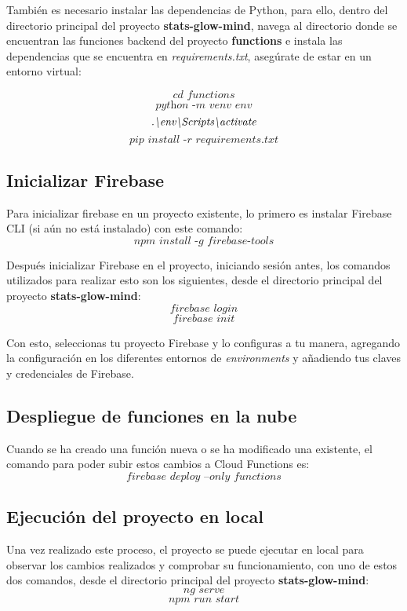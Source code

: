 También es necesario instalar las dependencias de Python, para ello, dentro del directorio principal del proyecto \textbf{stats-glow-mind}, navega al directorio donde se encuentran las funciones backend del proyecto \textbf{functions} e instala las dependencias que se encuentra en \textit{requirements.txt}, asegúrate de estar en un entorno virtual:

$$ \textit{cd functions} $$
$$ \textit{python -m venv env} $$
$$ \textit{.\text{\textbackslash}env\text{\textbackslash}Scripts\text{\textbackslash}activate} $$
$$ \textit{pip install -r requirements.txt} $$

\subsection{Inicializar Firebase}

Para inicializar firebase en un proyecto existente, lo primero es instalar Firebase CLI (si aún no está instalado) con este comando:
$$ \textit{npm install -g firebase-tools} $$

Después inicializar Firebase en el proyecto, iniciando sesión antes, los comandos utilizados para realizar esto son los siguientes, desde el directorio principal del proyecto \textbf{stats-glow-mind}:
$$ \textit{firebase login} $$
$$ \textit{firebase init} $$

Con esto, seleccionas tu proyecto Firebase y lo configuras a tu manera, agregando la configuración en los diferentes entornos de \textit{environments} y añadiendo tus claves y credenciales de Firebase.

\subsection{Despliegue de funciones en la nube}

Cuando se ha creado una función nueva o se ha modificado una existente, el comando para poder subir estos cambios a Cloud Functions es:
$$ \textit{firebase deploy --only functions} $$

\subsection{Ejecución del proyecto en local}

Una vez realizado este proceso, el proyecto se puede ejecutar en local para observar los cambios realizados y comprobar su funcionamiento, con uno de estos dos comandos, desde el directorio principal del proyecto \textbf{stats-glow-mind}:
$$ \textit{ng serve} $$ $$ \textit{npm run start} $$

